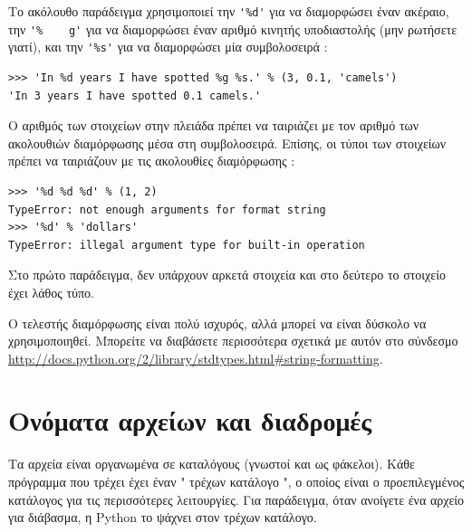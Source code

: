 \documentclass[10pt]{book}
\begin{document}
Το ακόλουθο παράδειγμα χρησιμοποιεί την  \verb"'%d'"  για να διαμορφώσει έναν ακέραιο, την  \verb"'%	g'"  για να 
διαμορφώσει έναν αριθμό κινητής υποδιαστολής (μην ρωτήσετε γιατί), και την  \verb"'%s'"  για να διαμορφώσει μία συμβολοσειρά :

\begin{verbatim}
>>> 'In %d years I have spotted %g %s.' % (3, 0.1, 'camels')
'In 3 years I have spotted 0.1 camels.'
\end{verbatim}
%
 
Ο αριθμός των στοιχείων στην πλειάδα πρέπει να ταιριάζει με τον αριθμό των ακολουθιών διαμόρφωσης μέσα στη συμβολοσειρά. 
Επίσης, οι τύποι των στοιχείων πρέπει να ταιριάζουν με τις ακολουθίες διαμόρφωσης :

\begin{verbatim}
>>> '%d %d %d' % (1, 2)
TypeError: not enough arguments for format string
>>> '%d' % 'dollars'
TypeError: illegal argument type for built-in operation
\end{verbatim}
%
 Στο πρώτο παράδειγμα, δεν υπάρχουν αρκετά στοιχεία και στο δεύτερο το στοιχείο έχει λάθος τύπο.

Ο τελεστής διαμόρφωσης είναι πολύ ισχυρός, αλλά μπορεί να είναι δύσκολο να χρησιμοποιηθεί. Μπορείτε να διαβάσετε περισσότερα 
σχετικά με αυτόν στο σύνδεσμο  \url{http://docs.python.org/2/library/stdtypes.html#string-formatting}. 




\section{Ονόματα αρχείων και διαδρομές}
\label{paths}

Τα αρχεία είναι οργανωμένα σε καταλόγους (γνωστοί και ως φάκελοι). Κάθε πρόγραμμα που τρέχει έχει έναν  " τρέχων κατάλογο ",   ο οποίος είναι ο προεπιλεγμένος κατάλογος για τις περισσότερες λειτουργίες. Για παράδειγμα, όταν ανοίγετε ένα αρχείο για διάβασμα, η  Python  το ψάχνει στον τρέχων κατάλογο.
\end{document}
